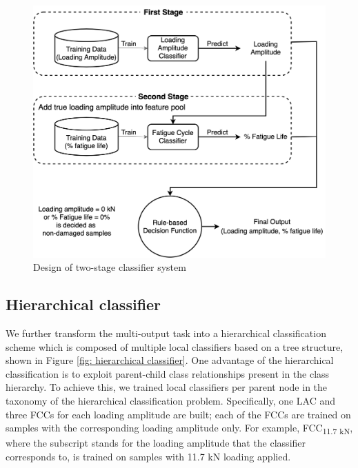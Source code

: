 \begin{figure}[tb]
    \centering
    \includegraphics[width=0.9\linewidth]{fig/two-stage_classifier.png}
    \caption{Design of two-stage classifier system}
    \label{fig: two-stage classifier}
\end{figure}

\subsection{Hierarchical classifier}
We further transform the multi-output task into a hierarchical classification scheme which is composed of multiple local classifiers based on a tree structure, shown in Figure \ref{fig: hierarchical classifier}. One advantage of the hierarchical classification is to exploit parent-child class relationships present in the class hierarchy. To achieve this, we trained local classifiers per parent node in the taxonomy of the hierarchical classification problem. Specifically, one LAC and three FCCs for each loading amplitude are built; each of the FCCs are trained on samples with the corresponding loading amplitude only. For example, FCC\textsubscript{11.7 kN}, where the subscript stands for the loading amplitude that the classifier corresponds to, is trained on samples with 11.7 kN loading applied. 

